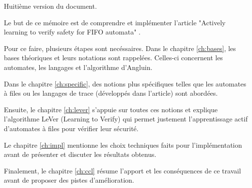 Huitième version du document.


Le but de ce mémoire est de comprendre et implémenter l'article "Actively learning to verify safety for FIFO automata" \cite{Vardhan04}.

Pour ce faire, plusieurs étapes sont necéssaires. Dans le chapitre \ref{ch:bases}, les bases théoriques et leurs notations sont rappelées. Celles-ci concernent les automates, les langages et l'algorithme d'Angluin.

Dans le chapitre \ref{ch:specific}, des notions plus spécifiques telles que les automates à files ou les langages de trace (développés dans l'article) sont abordées.

Ensuite, le chapitre \ref{ch:lever} s'appuie sur toutes ces notions et explique l'algorithme LeVer (Learning to Verify) qui permet justement l'apprentissage actif d'automates à files pour vérifier leur sécurité.

Le chapitre \ref{ch:impl} mentionne les choix techniques faits pour l'implémentation avant de présenter et discuter les résultats obtenus.

Finalement, le chapitre \ref{ch:ccl} résume l'apport et les conséquences de ce travail avant de proposer des pistes d'amélioration.
